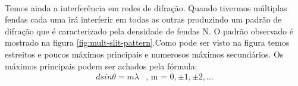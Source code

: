 \documentclass[a4paper,11pt]{article}
\begin{document}
\paragraph{} Temos ainda a interferência em redes de difração.
 Quando tivermos múltiplas fendas cada
uma irá interferir em todas as outras produzindo um padrão de difração
que é caracterizado pela densidade
de fendas N. O padrão observado é mostrado na figura
\ref{fig:mult-slit-pattern}.Como pode ser
visto na figura temos estreitos e poucos máximos principais e
numerosos máximos secundários. Os
máximos principais podem ser achados pela fórmula:
\begin{equation}
    \begin{array}{ll}
    d sin \theta = m \lambda & \mbox{, m = } 0, \pm 1, \pm 2, \ldots
   \end{array}
\label{eq:rede}
\end{equation}
\end{document}

